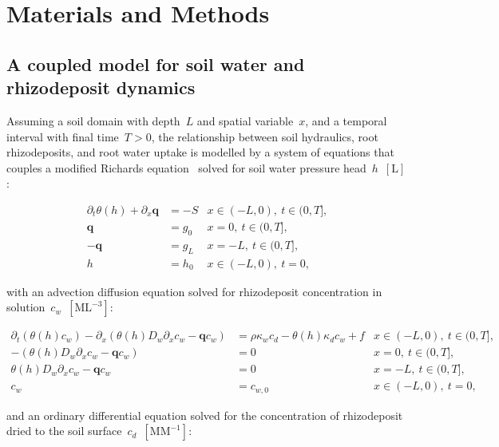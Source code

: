 \documentclass[11pt,a4paper]{article}
\numberwithin{equation}{section}
\begin{document}
\section{Materials and Methods}
\subsection{A coupled model for soil water and rhizodeposit dynamics}\label{subsec: models}  
Assuming a soil domain with depth~$L$ and spatial variable~$x$, and a temporal interval with final time~$T>0$, the relationship between soil hydraulics, root rhizodeposits, and root water uptake is modelled by a system of equations that couples a modified Richards equation~\citep{richards1931capillary} solved for soil water pressure head~$h$~$[\text{L}]$:
\begin{linenomath*}
	\begin{equation}\label{model: water transport}
		\begin{aligned}
			\partial_t\theta(h) + \partial_x\mathbf{q} &= - S &x\in(-L,0),~t\in(0, T],\\
			\mathbf{q} &= g_0 &x = 0,~t\in(0, T],\\  
			-\mathbf{q} &= g_L &x = -L,~t\in(0, T],\\
			h &= h_0 & x\in(-L,0),~t=0, 
		\end{aligned}
	\end{equation}
\end{linenomath*}	
with an advection diffusion equation solved for rhizodeposit concentration in solution~$c_w$~$[\text{ML}^{-3}]$:
\begin{linenomath*}
	\begin{equation}\label{model: rhizodeposits in solution}
		\begin{aligned}
			\partial_t{(\theta(h) c_w)} - \partial_x(\theta(h) D_w\partial_xc_w - \mathbf{q}c_w) &= \rho\kappa_wc_d - \theta(h)\kappa_dc_w + f  
			&x\in(-L,0),~t\in(0, T],\\
			 - (\theta(h) D_w\partial_xc_w - \mathbf{q}c_w)&= 0 &x = 0,~t\in(0, T],\\
			 \theta(h) D_w\partial_xc_w - \mathbf{q}c_w&= 0 &x = -L,~t\in(0, T],\\  
			 c_w & = c_{w,0} &x\in(-L,0),~t=0,	 
		\end{aligned}
	\end{equation}
\end{linenomath*}
and an ordinary differential equation solved for the concentration of rhizodeposit dried to the soil surface~$c_d$~$[\text{MM}^{-1}]$:  
\end{document}
